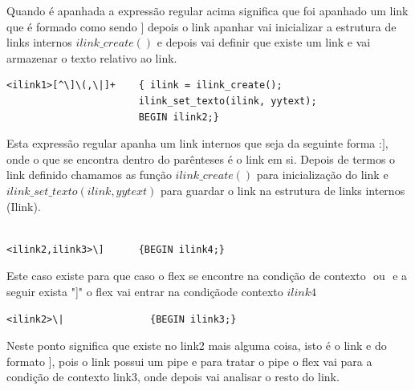 \documentclass[11pt, a4paper, oneside]{article}
\begin{document}
Quando é apanhada a expressão regular acima significa que foi apanhado um link que é formado como sendo \begin{math}[[Category:Salts]]\end{math} depois o link apanhar vai inicializar a estrutura de links internos \begin{math} ilink\_create() \end{math} e depois vai definir que existe um link e vai armazenar o texto relativo ao link.

\begin{verbatim}
<ilink1>[^\]\(,\|]+    { ilink = ilink_create();
                       ilink_set_texto(ilink, yytext);
                       BEGIN ilink2;}
\end{verbatim}
Esta expressão regular apanha um link internos que seja da seguinte forma :\begin{math}[[Salts]]\end{math}, onde o que se encontra dentro do parênteses é o link em si. Depois de termos o link definido chamamos as função \begin{math} ilink\_create() \end{math} para inicialização do link e  \begin{math}ilink\_set\_texto(ilink, yytext)\end{math} para guardar o link na estrutura de links internos (Ilink).


\begin{verbatim}

<ilink2,ilink3>\]      {BEGIN ilink4;}
\end{verbatim}
Este caso existe para que caso o flex se encontre na condição de contexto \begin{math}<ilink2>\end{math} ou \begin{math}<ilink3>\end{math} e a seguir exista "]" o flex vai entrar na condiçãode contexto \begin{math}ilink4\end{math}




\begin{verbatim}
<ilink2>\|               {BEGIN ilink3;}
\end{verbatim}


Neste ponto significa que existe no link2 mais alguma coisa, isto é o link e do formato \begin{math}[[Crystallite|grain boundaries]]\end{math}, pois o link possui um pipe e para tratar o pipe o flex vai para a condição de contexto link3, onde depois vai analisar o resto do link. 
\end{document}
